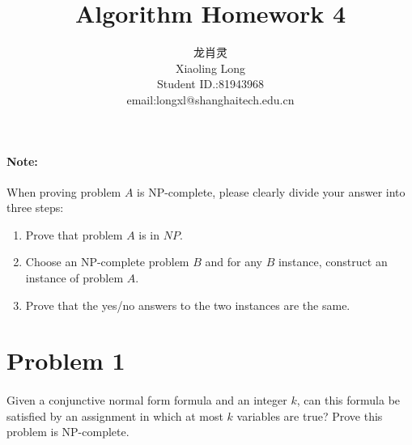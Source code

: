 \documentclass[a4paper]{article}
\title{Algorithm Homework 4}
\author{龙肖灵 \\Xiaoling Long\\Student ID.:81943968\\email:longxl@shanghaitech.edu.cn}
\begin{document}
\maketitle

\paragraph{Note:}When proving problem $A$ is NP-complete, please clearly divide your answer into three steps:
\begin{enumerate}[(1)]
  \item Prove that problem $A$ is in $NP$.
  \item Choose an NP-complete problem $B$ and for any $B$ instance, construct an instance of problem $A$.
  \item Prove that the yes/no answers to the two instances are the same.
\end{enumerate}


\section*{Problem 1}
\paragraph{}
Given a conjunctive normal form formula and an integer $k$, can this formula be satisfied by an assignment
in which at most $k$ variables are true? Prove this problem is NP-complete.
\end{document}
